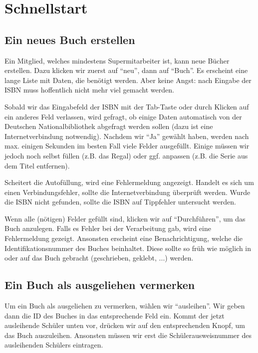 




\maketitle
\newpage

\tableofcontents
\newpage

\section{Schnellstart}
\label{sec:quickstart}
\subsection{Ein neues Buch erstellen}
\label{subsec:quickstart:new_book}
Ein Mitglied, welches mindestens Supermitarbeiter ist, kann neue Bücher erstellen. Dazu klicken wir zuerst auf ``neu'', dann auf ``Buch''. Es erscheint eine lange Liste mit Daten, die benötigt werden. 
Aber keine Angst: nach Eingabe der ISBN muss hoffentlich nicht mehr viel gemacht werden.

Sobald wir das Eingabefeld der ISBN mit der Tab-Taste oder durch Klicken auf ein anderes Feld verlassen, wird gefragt,
ob einige Daten automatisch von der Deutschen Nationalbibliothek abgefragt werden sollen (dazu ist eine Internetverbindung notwendig).
Nachdem wir ``Ja'' gewählt haben, werden nach max. einigen Sekunden im besten Fall viele Felder ausgefüllt.
Einige müssen wir jedoch noch selbst füllen (z.B. das Regal) oder ggf. anpassen (z.B. die Serie aus dem Titel entfernen).

Scheitert die Autofüllung, wird eine Fehlermeldung angezeigt. Handelt es sich um einen Verbindungsfehler, sollte die Internetverbindung überprüft werden. Wurde die ISBN nicht gefunden, sollte die ISBN auf Tippfehler untersucht werden.

Wenn alle (nötigen) Felder gefüllt sind, klicken wir auf ``Durchführen'', um das Buch anzulegen.
Falls es Fehler bei der Verarbeitung gab, wird eine Fehlermeldung gezeigt. Ansonsten erscheint eine Benachrichtigung, welche die Identifikationsnummer des Buches beinhaltet.
Diese sollte so früh wie möglich in oder auf das Buch gebracht (geschrieben, geklebt, ...) werden.

\subsection{Ein Buch als ausgeliehen vermerken}
\label{subsec:quickstart:borrow}
Um ein Buch als ausgeliehen zu vermerken, wählen wir ``ausleihen''. Wir geben dann die ID des Buches in das entsprechende Feld ein. Kommt der jetzt ausleihende Schüler unten vor, drücken wir auf den entsprechenden Knopf, um das Buch auszuleihen. Ansonsten müssen wir erst die Schülerausweisnummer des ausleihenden Schülers eintragen.

